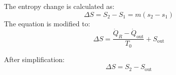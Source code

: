 The entropy change is calculated as:  
\[
\Delta S = S_2 - S_1 = m (s_2 - s_1)
\]  
The equation is modified to:  
\[
\Delta S = \frac{\dot{Q}_R - \dot{Q}_{\text{out}}}{T_0} + S_{\text{out}}
\]  

After simplification:  
\[
\Delta S = S_2 - S_{\text{out}}
\]
